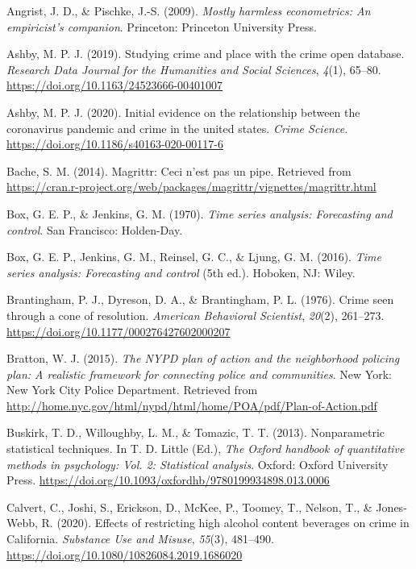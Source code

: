 \documentclass[
  english,
  man,a4paper,mask,floatsintext]{apa6}
\begin{document}
\leavevmode\hypertarget{ref-Angrist:2009aa}{}%
Angrist, J. D., \& Pischke, J.-S. (2009). \emph{Mostly harmless econometrics: An empiricist's companion}. Princeton: Princeton University Press.

\leavevmode\hypertarget{ref-Ashby:2019aa}{}%
Ashby, M. P. J. (2019). Studying crime and place with the crime open database. \emph{Research Data Journal for the Humanities and Social Sciences}, \emph{4}(1), 65--80. \url{https://doi.org/10.1163/24523666-00401007}

\leavevmode\hypertarget{ref-Ashby:2020ab}{}%
Ashby, M. P. J. (2020). Initial evidence on the relationship between the coronavirus pandemic and crime in the united states. \emph{Crime Science}. \url{https://doi.org/10.1186/s40163-020-00117-6}

\leavevmode\hypertarget{ref-Bache:2014aa}{}%
Bache, S. M. (2014). Magrittr: Ceci n'est pas un pipe. Retrieved from \url{https://cran.r-project.org/web/packages/magrittr/vignettes/magrittr.html}

\leavevmode\hypertarget{ref-Box:1970aa}{}%
Box, G. E. P., \& Jenkins, G. M. (1970). \emph{Time series analysis: Forecasting and control}. San Francisco: Holden-Day.

\leavevmode\hypertarget{ref-Box:2016aa}{}%
Box, G. E. P., Jenkins, G. M., Reinsel, G. C., \& Ljung, G. M. (2016). \emph{Time series analysis: Forecasting and control} (5th ed.). Hoboken, NJ: Wiley.

\leavevmode\hypertarget{ref-Brantingham:1976aa}{}%
Brantingham, P. J., Dyreson, D. A., \& Brantingham, P. L. (1976). Crime seen through a cone of resolution. \emph{American Behavioral Scientist}, \emph{20}(2), 261--273. \url{https://doi.org/10.1177/000276427602000207}

\leavevmode\hypertarget{ref-Bratton:2015aa}{}%
Bratton, W. J. (2015). \emph{The NYPD plan of action and the neighborhood policing plan: A realistic framework for connecting police and communities}. New York: New York City Police Department. Retrieved from \url{http://home.nyc.gov/html/nypd/html/home/POA/pdf/Plan-of-Action.pdf}

\leavevmode\hypertarget{ref-Buskirk:2013aa}{}%
Buskirk, T. D., Willoughby, L. M., \& Tomazic, T. T. (2013). Nonparametric statistical techniques. In T. D. Little (Ed.), \emph{The Oxford handbook of quantitative methods in psychology: Vol. 2: Statistical analysis}. Oxford: Oxford University Press. \url{https://doi.org/10.1093/oxfordhb/9780199934898.013.0006}

\leavevmode\hypertarget{ref-Calvert:2020aa}{}%
Calvert, C., Joshi, S., Erickson, D., McKee, P., Toomey, T., Nelson, T., \& Jones-Webb, R. (2020). Effects of restricting high alcohol content beverages on crime in California. \emph{Substance Use and Misuse}, \emph{55}(3), 481--490. \url{https://doi.org/10.1080/10826084.2019.1686020}
\end{document}
